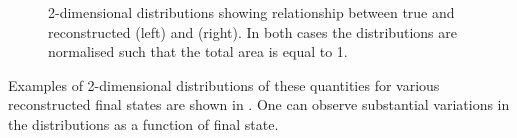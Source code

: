 \begin{figure}[h]
	\begin{minipage}[t]{.5\linewidth}
		\begin{adjustbox}{max totalsize=\linewidth, center}
			
		\end{adjustbox}	
	\end{minipage}
	\hfill
	\begin{minipage}[t]{.5\linewidth}
		\begin{adjustbox}{max totalsize=\linewidth, center}
			
		\end{adjustbox}
	\end{minipage}
	\caption[True vs. reconstructed \evis (left) and \pvis (right).]{2-dimensional distributions showing relationship between true and reconstructed \evis (left) and \pvis (right). In both cases the distributions are normalised such that the total area is equal to 1.}
	\label{fig:visibleTrueReco}
\end{figure}

Examples of 2-dimensional distributions of these quantities for various reconstructed final states are shown in .
One can observe substantial variations in the distributions as a function of final state.

